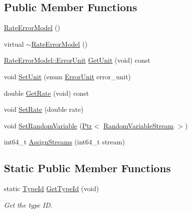 \subsection*{Public Member Functions}
\begin{DoxyCompactItemize}
\item 
\hyperlink{classns3_1_1RateErrorModel_ac2f48cadd5c294ce6e41ce7d1fc2ae95}{Rate\+Error\+Model} ()
\item 
virtual \hyperlink{classns3_1_1RateErrorModel_a8f26b71e80ba5e3ca1ddec245053e5f2}{$\sim$\+Rate\+Error\+Model} ()
\item 
\hyperlink{classns3_1_1RateErrorModel_a4da336ba2dfcb55e0b7d7a3e7e713c02}{Rate\+Error\+Model\+::\+Error\+Unit} \hyperlink{classns3_1_1RateErrorModel_a7bcc5b45222fa7edc21db906a6a10e2f}{Get\+Unit} (void) const 
\item 
void \hyperlink{classns3_1_1RateErrorModel_ac0005509646ec8b04d68409de82988b1}{Set\+Unit} (enum \hyperlink{classns3_1_1RateErrorModel_a4da336ba2dfcb55e0b7d7a3e7e713c02}{Error\+Unit} error\+\_\+unit)
\item 
double \hyperlink{classns3_1_1RateErrorModel_a6cde4352cd1763c8f5f5e58772ab8b63}{Get\+Rate} (void) const 
\item 
void \hyperlink{classns3_1_1RateErrorModel_a145e894e154f238a4a8f42c215856d63}{Set\+Rate} (double rate)
\item 
void \hyperlink{classns3_1_1RateErrorModel_ad4d6eefa1dd7c83e783b56fa23386e5d}{Set\+Random\+Variable} (\hyperlink{classns3_1_1Ptr}{Ptr}$<$ \hyperlink{classns3_1_1RandomVariableStream}{Random\+Variable\+Stream} $>$)
\item 
int64\+\_\+t \hyperlink{classns3_1_1RateErrorModel_a759d58c787549d27e35729a4a850648a}{Assign\+Streams} (int64\+\_\+t stream)
\end{DoxyCompactItemize}
\subsection*{Static Public Member Functions}
\begin{DoxyCompactItemize}
\item 
static \hyperlink{classns3_1_1TypeId}{Type\+Id} \hyperlink{classns3_1_1RateErrorModel_a8e9bf4ad896e5e4cc95895a301e35bb3}{Get\+Type\+Id} (void)
\begin{DoxyCompactList}\small\item\em Get the type ID. \end{DoxyCompactList}\end{DoxyCompactItemize}
